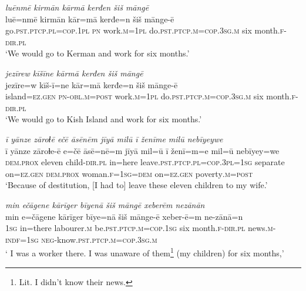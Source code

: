 \ea \label{ŽM.24}
\textit{luēnmē kirmān kārmā kerđen šiš māngē} \\ 
\gll luē=nmē kirmān kār=mā kerđe=n šiš mānge-ē \\ 
 go\textsc{.pst}\textsc{.ptcp}\textsc{.pl}\textsc{=cop}\textsc{.\textsc{1pl}} \textsc{pn} work\textsc{.m}\textsc{=\textsc{1pl}} do\textsc{.pst}\textsc{.ptcp}\textsc{.m}\textsc{=cop}\textsc{.3sg}\textsc{.m} six month\textsc{.f}\textsc{-dir}\textsc{.pl} \\ 
\glt `We would go to Kerman and work for six months.'
\z 
 
\ea \label{ŽM.25}
\textit{jezīrew kīšīne kārmā kerđen šiš māngē} \\ 
\gll jezīre=w kīš-ī=ne kār=mā kerđe=n šiš mānge-ē \\ 
 island\textsc{=ez.gen} \textsc{pn}\textsc{-obl}\textsc{.m}\textsc{=\textsc{post}} work\textsc{.m}\textsc{=\textsc{1pl}} do\textsc{.pst}\textsc{.ptcp}\textsc{.m}\textsc{=cop}\textsc{.3sg}\textsc{.m} six month\textsc{.f}\textsc{-dir}\textsc{.pl} \\ 
\glt `We would go to Kish Island and work for six months.'
\z 
 
\ea \label{ŽM.27}
\textit{ī yānze zāroɫē ečē āsēnēm jīyā milū ī ženīme milū nebīyeywe} \\ 
\gll ī yānze zāroɫe-ē e=čē āsē=nē=m jīyā mil=ū ī ženī=m=e mil=ū nebīyey=we \\ 
 \textsc{dem.prox} eleven child\textsc{-dir}\textsc{.pl} in=here leave\textsc{.pst}\textsc{.ptcp}\textsc{.pl}\textsc{=cop}\textsc{.3pl}\textsc{=\textsc{1sg}} separate on\textsc{=ez.gen} \textsc{dem.prox} woman\textsc{.f}\textsc{=\textsc{1sg}}\textsc{=dem} on\textsc{=ez.gen} poverty\textsc{.m}\textsc{=\textsc{post}} \\ 
\glt `Because of destitution, [I had to] leave these eleven children to my wife.'
\z 
 
\ea \label{ŽM.28}
\textit{min ečāgene kārīger bīyenā šiš māngē xeberēm nezānān} \\ 
\gll min e=čāgene kārīger bīye=nā šiš mānge-ē xeber-ē=m ne-zānā=n \\ 
 \textsc{1sg} in=there labourer\textsc{.m} be\textsc{.pst}\textsc{.ptcp}\textsc{.m}\textsc{=cop}\textsc{.\textsc{1sg}} six month\textsc{.f}\textsc{-dir}\textsc{.pl} news\textsc{.m}\textsc{-indf}\textsc{=\textsc{1sg}} \textsc{neg-}know\textsc{.pst}\textsc{.ptcp}\textsc{.m}\textsc{=cop}\textsc{.3sg}\textsc{.m} \\ 
\glt ` I was a worker there. I was unaware of them\footnote{Lit. I didn’t know their news.}  (my children) for six months,'
\z 
 

